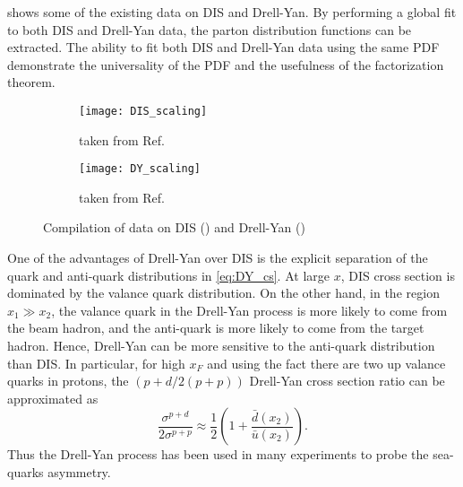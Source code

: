 \documentclass[../main.tex]{subfiles}
\begin{document}
 shows some of the existing data on DIS and Drell-Yan. By
performing a global fit to both DIS and Drell-Yan data, the parton distribution
functions can be extracted. The ability to fit both DIS and Drell-Yan data using
the same PDF demonstrate the universality of the PDF and the usefulness of the
factorization theorem.
\begin{figure}[htbp!]
	\centering
	\begin{subfigure}{0.45\linewidth}
		\texttt{[image: DIS\_scaling]}
		\caption{taken from Ref.~\cite{theh1collaboration2003}}
		\label{subfig:DIS_scaling}
	\end{subfigure}
	\begin{subfigure}{0.45\linewidth}
		\texttt{[image: DY\_scaling]}
		\caption{taken from Ref.~\cite{mcgaughey1999}}
		\label{subfig:DY_scaling}
	\end{subfigure}
	\caption{Compilation of data on DIS () and
		Drell-Yan ()}
	\label{fig:scaling}
\end{figure}
One of the advantages of Drell-Yan over DIS is the explicit separation of the quark
and anti-quark distributions in \cref{eq:DY_cs}. At large $x$, DIS cross section
is dominated by the valance quark distribution. On the other hand, in the region $x_1 \gg x_2$,
the valance quark in the Drell-Yan process is more likely to come from the beam
hadron, and the anti-quark is more likely to come from the target hadron. Hence,
Drell-Yan can be more sensitive to the anti-quark distribution than DIS. In
particular, for high $x_F$ and using the fact there are two up valance quarks in
protons, the $(p+d/2(p+p))$ Drell-Yan cross section ratio can be approximated as
\begin{equation}
	\frac{\sigma^{p+d}}{2\sigma^{p+p}} \approx \frac{1}{2} \left( 1+ \frac{\bar{d}\left(x_2\right)}{\bar{u}\left(x_2\right)} \right).
\end{equation}
Thus the Drell-Yan process has been used in many experiments to probe the sea-quarks
asymmetry.
\end{document}
